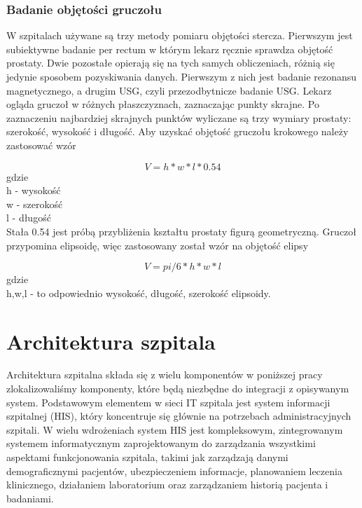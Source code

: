 \documentclass[a4paper,11pt,twoside]{report}
\theoremstyle{definition}
\begin{document}
\subsubsection{Badanie objętości gruczołu}
W szpitalach używane są trzy metody pomiaru objętości stercza. Pierwszym jest subiektywne badanie per rectum w którym lekarz ręcznie sprawdza objętość prostaty. Dwie pozostałe opierają się na tych samych obliczeniach, różnią się jedynie sposobem pozyskiwania danych. Pierwszym z nich jest badanie rezonansu magnetycznego, a drugim USG, czyli przezodbytnicze badanie USG. Lekarz ogląda gruczoł w różnych płaszczyznach, zaznaczając punkty skrajne. Po zaznaczeniu najbardziej skrajnych punktów wyliczane są trzy wymiary prostaty: szerokość, wysokość i długość. Aby uzyskać objętość gruczołu krokowego należy zastosować wzór 

\[V = h*w* l * 0.54\]
gdzie \\
h - wysokość \\
w - szerokość \\
l - długość \\
Stała 0.54 jest próbą przybliżenia kształtu prostaty figurą geometryczną. Gruczoł przypomina elipsoidę, więc zastosowany został wzór na objętość elipsy

\[V = pi/6 * h*w*l\]
gdzie \\
h,w,l - to odpowiednio wysokość, długość, szerokość elipsoidy. \\

\section{Architektura szpitala}

Architektura szpitalna składa się z wielu komponentów w poniższej pracy zlokalizowaliśmy komponenty, które będą niezbędne do integracji z opisywanym system. Podstawowym elementem w sieci IT szpitala jest system informacji szpitalnej (HIS), który koncentruje się głównie na potrzebach administracyjnych szpitali. W wielu wdrożeniach system HIS jest kompleksowym, zintegrowanym systemem informatycznym zaprojektowanym do zarządzania wszystkimi aspektami funkcjonowania szpitala, takimi jak zarządzają danymi demograficznymi pacjentów, ubezpieczeniem informacje, planowaniem leczenia klinicznego, działaniem laboratorium oraz zarządzaniem historią pacjenta i badaniami.
\end{document}
